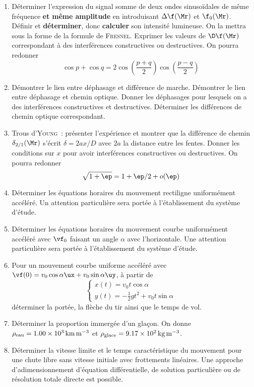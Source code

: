 \documentclass[a4paper, 10pt, final, garamond]{book}
\begin{document}
\begin{enumerate}[resume]
    \item Déterminer l'expression du signal somme de deux ondes sinusoïdales de
        même fréquence \textbf{et même amplitude} en introduisant $\Delta
        \f(\Mr)$ et $\f_0(\Mr)$. Définir et \textbf{déterminer}, donc
        \textbf{calculer} son intensité lumineuse. On la mettra sous la forme de
        la formule de \textsc{Fresnel}. Exprimer les valeurs de $\D\f(\Mr)$
        correspondant à des interférences constructives ou destructives.
        On pourra redonner
        \[\cos p + \cos q =
            2\cos \left( \frac{p+q}{2} \right)\cos \left( \frac{p-q}{2} \right)\]
    \item Démontrer le lien entre déphasage et différence de marche. Démontrer
        le lien entre déphasage et chemin optique. Donner les déphasages pour
        lesquels on a des interférences constructives et destructives.
        Déterminer les différences de chemin optique correspondant.
    \item Trous d'\textsc{Young}~: présenter l'expérience et montrer que la
        différence de chemin $\delta_{2/1}(\Mr)$ s'écrit \hfill $\delta =
        2ax/D$ avec $2a$ la distance entre les fentes. Donner les conditions sur
        $x$ pour avoir interférences constructives ou destructives. \smallbreak
        On pourra redonner
        \[\sqrt{1+\ep} = 1 + \ep/2 + o(\ep)\]
    \item Déterminer les équations horaires du mouvement rectiligne uniformément
        accéléré. Un attention particulière sera portée à l'établissement du
        système d'étude.
    \item Déterminer les équations horaires du mouvement courbe uniformément
        accéléré avec $\vf_0$ faisant un angle $\alpha$ avec l'horizontale. Une
        attention particulière sera portée à l'établissement du système d'étude.
    \item Pour un mouvement courbe uniforme accéléré avec $\vf(0) =
        v_0\cos\alpha\ux + v_0\sin\alpha\uy$, à partir de
        \[ \left\{
                \begin{array}{l}
                    x(t) = v_0t\cos\alpha\\
                    y(t) = -\frac{1}{2}gt^2 + v_0t \sin\alpha
                \end{array}
            \right.
        \]
        déterminer la portée, la flèche du tir ainsi que le temps de vol.
    \item Déterminer la proportion immergée d'un glaçon. On donne $\rho_{\rm
        eau} = \SI{1.00e3}{km.m^{-3}}$ et $\rho_{\rm glace} =
        \SI{9.17e2}{kg.m^{-3}}$.

    \item Déterminer la vitesse limite et le temps caractéristique du mouvement
        pour une chute libre sans vitesse initiale avec frottements linéaires.
        Une approche d'adimensionnement d'équation différentielle, de solution
        particulière ou de résolution totale directe est possible.
\end{enumerate}
\end{document}
